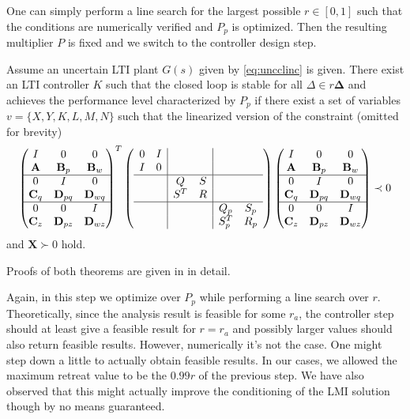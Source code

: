 One can simply perform a line search for the largest possible $r\in[0,1]$ such that the conditions are numerically
verified and $P_p$ is optimized. Then the resulting multiplier $P$ is fixed and we switch to the controller design step.

\begin{thm}\label{thm:synthesis} Assume an uncertain LTI plant $G(s)$ given by \eqref{eq:uncclinc}
is given. There exist an LTI controller $K$ such that the closed loop is stable for all $\Delta\in r\bm{\Delta}$ and achieves 
the performance level characterized by $P_p$ if there exist a set of variables $v=\{X,Y,K,L,M,N\}$ such that the linearized 
version of the constraint (omitted for brevity)
\begin{equation}
\begin{pmatrix}
I&0&0\\\mathbf{A}&\mathbf{B}_p&\mathbf{B}_w\\\hline
0&I&0\\\mathbf{C}_q&\mathbf{D}_{pq}&\mathbf{D}_{wq}\\\hline
0&0&I\\\mathbf{C}_z&\mathbf{D}_{pz}&\mathbf{D}_{wz}
\end{pmatrix}^T
\left(
\begin{array}{cc|cc|cc}
	0&I&&&&\\
	I&0&&&&\\\hline
	&&Q&S&&\\
	&&S^T&R&&\\\hline
	&&&&Q_p&S_p\\
	&&&&S_p^T&R_p\\
\end{array}
\right)
\begin{pmatrix}
I&0&0\\\mathbf{A}&\mathbf{B}_p&\mathbf{B}_w\\\hline
0&I&0\\\mathbf{C}_q&\mathbf{D}_{pq}&\mathbf{D}_{wq}\\\hline
0&0&I\\\mathbf{C}_z&\mathbf{D}_{pz}&\mathbf{D}_{wz}
\end{pmatrix}\prec 0
\label{eq:thmsynthLMI}
\end{equation}
and $\mathbf{X}\succ 0$ hold.
\end{thm}

Proofs of both theorems are given in \cite{lmibook99} in detail. 


Again, in this step we optimize over $P_p$ while performing a line search over $r$. Theoretically, since the analysis result
is feasible for some $r_a$, the controller step should at least give a feasible result for $r=r_a$ and possibly larger values
should also return feasible results. However, numerically it's not the case. One might step down a little to actually obtain 
feasible results. In our cases, we allowed the maximum retreat value to be the $0.99r$ of the previous step. We have also 
observed that this might actually improve the conditioning of the LMI solution though by no means guaranteed. 

